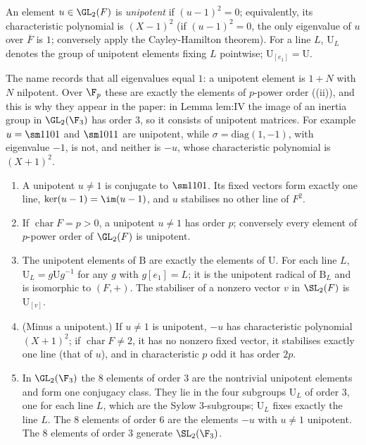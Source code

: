 \begin{definition}\label{def:groups:unipotent}
An element $u\in\GL_2(F)$ is \emph{unipotent} if $(u-1)^2=0$; equivalently, its characteristic polynomial is $(X-1)^2$ (if $(u-1)^2=0$, the only
eigenvalue of $u$ over $\overline F$ is $1$; conversely apply the Cayley-Hamilton theorem). For a line $L$, $\mathrm U_L$ denotes the group of unipotent elements
fixing $L$ pointwise; $\mathrm U_{[e_1]}=\mathrm U$.
\end{definition}

The name records that all eigenvalues equal $1$: a unipotent element is $1+N$ with $N$ nilpotent. Over $\F_p$ these are exactly the elements of $p$-power order
((ii)), and this is why they appear in the paper: in Lemma lem:IV the image of an inertia group in $\GL_2(\F_3)$ has order $3$,
so it consists of unipotent matrices. For example $u=\sm1101$ and $\sm1011$ are unipotent, while $\sigma=\mathrm{diag}(1,-1)$, with eigenvalue $-1$, is not, and
neither is $-u$, whose characteristic polynomial is $(X+1)^2$.

\begin{proposition}\label{prop:groups:unipotent}
\begin{enumerate}[label=(\roman*)]
\item A unipotent $u\ne1$ is conjugate to $\sm1101$. Its fixed vectors form exactly one line, $\ker(u-1)=\im(u-1)$, and $u$ stabilises no other line
of $F^2$.
\item If $\operatorname{char}F=p>0$, a unipotent $u\ne1$ has order $p$; conversely every element of $p$-power order of $\GL_2(F)$ is unipotent.
\item The unipotent elements of $\mathrm B$ are exactly the elements of $\mathrm U$. For each line $L$, $\mathrm U_L=g\mathrm Ug^{-1}$ for any $g$ with $g[e_1]=L$; it is the unipotent
radical of $\mathrm B_L$ and is isomorphic to $(F,+)$. The stabiliser of a nonzero vector $v$ in $\SL_2(F)$ is $\mathrm U_{[v]}$.
\item (Minus a unipotent.) If $u\ne1$ is unipotent, $-u$ has characteristic polynomial $(X+1)^2$; if $\operatorname{char}F\ne2$, it has no nonzero fixed vector, it
stabilises exactly one line (that of $u$), and in characteristic $p$ odd it has order $2p$.
\item In $\GL_2(\F_3)$ the $8$ elements of order $3$ are the nontrivial unipotent elements and form one conjugacy class. They lie in the four
subgroups $\mathrm U_L$ of order $3$, one for each line $L$, which are the Sylow $3$-subgroups; $\mathrm U_L$ fixes exactly the line $L$. The $8$ elements
of order $6$ are the elements $-u$ with $u\ne1$ unipotent. The $8$ elements of order $3$ generate $\SL_2(\F_3)$.
\end{enumerate}
\end{proposition}

